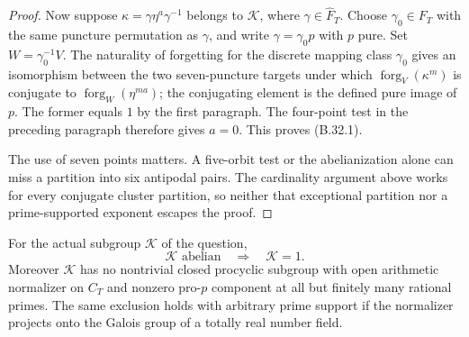 \begin{proof}
Now suppose $\kappa=\gamma\eta^a\gamma^{-1}$ belongs
to $\mathcal K$, where $\gamma\in\widehat F_T$.
Choose $\gamma_0\in F_T$ with the same puncture
permutation as $\gamma$, and write $\gamma=\gamma_0p$
with $p$ pure.  Set $W=\gamma_0^{-1}V$.  The naturality
of forgetting for the discrete mapping class
$\gamma_0$ gives an isomorphism between the two
seven-puncture targets under which
$\operatorname{forg}_V(\kappa^m)$ is conjugate to
$\operatorname{forg}_W(\eta^{ma})$; the conjugating
element is the defined pure image of $p$.
The former equals $1$ by the first paragraph.
The four-point test in the preceding paragraph
therefore gives $a=0$.  This proves (B.32.1).

The use of seven points matters.  A five-orbit
test or the abelianization alone can miss a
partition into six antipodal pairs.  The cardinality
argument above works for every conjugate cluster
partition, so neither that exceptional partition
nor a prime-supported exponent escapes the proof.
\end{proof}

For the actual subgroup $\mathcal K$ of the question,
\[
                         \mathcal K\text{ abelian}
                           \quad\Longrightarrow\quad\mathcal K=1.
                                                               \tag{B.33.1}
\]
Moreover $\mathcal K$ has no nontrivial closed procyclic
subgroup with open arithmetic normalizer on $C_T$
and nonzero pro-$p$ component at all but finitely
many rational primes.  The same exclusion holds
with arbitrary prime support if the normalizer
projects onto the Galois group of a totally real
number field.


